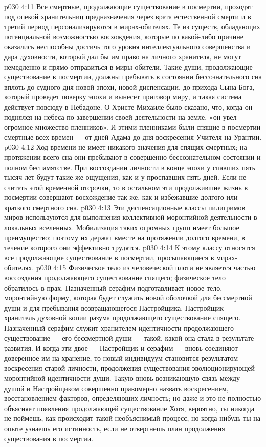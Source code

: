 \vs p030 4:11 \pc {}\bibnobreakspace {} Все смертные, продолжающие существование в посмертии, проходят под опекой хранительниц предназначения через врата естественной смерти и в третий период персонализируются в мирах\hyp{}обителях. Те из существ, обладающих потенциальной возможностью восхождения, которые по какой\hyp{}либо причине оказались неспособны достичь того уровня интеллектуального совершенства и дара духовности, который дал бы им право на личного хранителя, не могут немедленно и прямо отправиться в миры\hyp{}обители. Такие души, продолжающие существование в посмертии, должны пребывать в состоянии бессознательного сна вплоть до судного дня новой эпохи, новой диспенсации, до прихода Сына Бога, который проведет поверку эпохи и вынесет приговор миру, и такая система действует повсюду в Небадоне. О Христе\hyp{}Михаиле было сказано, что, когда он поднялся на небеса по завершении своей деятельности на земле, «он увел огромное множество пленников». И этими пленниками были спящие в посмертии смертные всех времен --- от дней Адама до дня воскресения Учителя на Урантии.
\vs p030 4:12 Ход времени не имеет никакого значения для спящих смертных; на протяжении всего сна они пребывают в совершенно бессознательном состоянии и полном беспамятстве. При воссоздании личности в конце эпохи у спавших пять тысяч лет будут такие же ощущения, как и у проспавших пять дней. Если не считать этой временной отсрочки, то в остальном эти продолжившие жизнь в посмертии совершают восхождение так же, как и избежавшие долгого или краткого смертного сна.
\vs p030 4:13 Эти диспенсационные классы пилигримов миров используются для выполнения коллективной моронтийной деятельности в локальных вселенных. Мобилизация таких огромных групп имеет большое преимущество; поэтому их держат вместе на протяжении долгого времени, в течение которого они эффективно трудятся.
\vs p030 4:14 \pc {}\bibnobreakspace {} К этому классу относятся все продолжающие существование в посмертии, просыпающиеся в мирах\hyp{}обителях.
\vs p030 4:15 Физическое тело из человеческой плоти не является частью воссоздания продолжающего существование спящего; физическое тело обратилось в прах. Назначенный серафим подготавливает новое тело, моронтийную форму, которая будет служить новой оболочкой для бессмертной души и для пребывания возвращающегося Настройщика. Настройщик --- хранитель духовной копии разума продолжающего существование спящего. Назначенный серафим служит хранителем идентичности продолжающего существование --- его бессмертной души --- такой, какой она стала в результате развития. И когда эти двое --- Настройщик и серафим --- вновь соединяют доверенное им на хранение, то новый индивидуум становится результатом воскресения старой личности, продолжения существования эволюционирующей моронтийной идентичности души. Такую вновь возникающую связь между душой и Настройщиком совершенно правомерно назвать воскресением, восстановлением факторов, определяющих личность; но даже и это не полностью объясняет появления продолжающей существование  Хотя, вероятно, ты никогда не поймешь, как происходит такой необъяснимый процесс, но когда\hyp{}нибудь ты на опыте узнаешь его истинность, если не отвергнешь план продолжения существования в посмертии.
